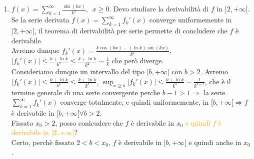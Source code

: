 \begin{exbar}
\begin{example}
\begin{enumerate}
		Se $\sum_{k=1}^{\infty} \frac{|\sin(k)|}{k}$ converge,  allora converge $\sum_{k=1}^{\infty} \frac{|\sin(k)|}{k+1}$ e, banalmente, anche $\sum_{k=1}^{\infty}|\frac{\sin(k+1)}{k+1}| \Rightarrow \sum_{k=1}^{\infty} \frac{|\cos(k)|}{k+1}$ converge, perchè $\sum_{k=1}^{\infty} \frac{\cos(k)}{k+1}$ è somma di serie assolutamente convergenti. Ma $\frac{|\cos(k)|}{k+1} \sim \frac{|\cos(k)|}{k}\Rightarrow \sum_{k=1}^{\infty}\frac{|\cos(k)|}{k}$ converge, cioè, se $\sum_{k=1}^{\infty} \frac{\sin{k}}{k}$ converge assolutamente, anche $\sum_{k=1}^{\infty} \frac{\cos(k)}{k}$ converge assolutamente, e questo è assurdo perchè $\frac{e^{ik}}{k}=\frac{\cos(k)}{k} +i \frac{\sin(k)}{k}$ e quindi $\sum_{k=1}^{\infty}\frac{e^{ik}}{k}$ convergerebbe assolutamente. Ma $\sum_{k=1}^{\infty} |\frac{e^{ik}}{k}|=\sum_{k=1}^{\infty}\frac{1}{k}$ diverge.
		\item $f(x)=\sum_{k=1}^{\infty} \frac{\sin(kx)}{k^x},\,\,\, x \geq 0$.
		Devo studiare la derivabilità di $f$ in $]2,+\infty[$. Se la serie derivata $f(x)=\sum_{k=1}^{\infty} f_k'(x)$ converge uniformemente in $]2,+\infty[$, il teorema di derivabilità per serie permette di concludere che $f$ è derivabile.\\
		Avremo dunque $ f_k'(x)=\frac{k \cos(kx)-(\ln k) \sin(kx)}{k^x}$,      $|f_k'(x)|\leq \frac{k+\ln k}{k^x} \leq \frac{k+\ln k}{k^2} \sim \frac{1}{k}$ che però diverge.\\
		Consideriamo dunque un intervallo del tipo $[b,+\infty[$ con $b >2$. Avremo $|f_k'(x)|\leq \frac{k+\ln k}{k^x} \leq \frac{k+\ln k}{k^b}$, $\sup_{ x \geq b}|f_k'(x)|\leq \frac{k +\ln k}{k^b}\sim \frac{1}{k^{b-1}}$, che è il termine generale di una serie convergente perche $b-1  > 1 \Rightarrow$ la serie $\sum_{k=1}^{\infty}f_k'(x)$ converge totalmente, e quindi uniformemente, in $[b,+\infty[ \Rightarrow f$ è derivabile in $[b,+\infty[ \forall b > 2$.\\
		Fissato $x_0 > 2$, posso conlcudere che $f$ è derivabile in $x_0$ \textcolor{orange}{e quindi $f$ è derivabile in $]2,+\infty[$}?\\
		Certo, perchè fissato $2 < b < x_0$, $f$ è derivabile in $[b,+\infty[$ e quindi anche in $x_0$.
	\end{enumerate}
\end{example}
\end{exbar}


